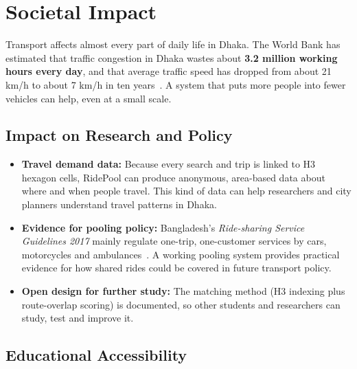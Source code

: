 \section{Societal Impact}
\label{sec:societal-impact}

Transport affects almost every part of daily life in Dhaka. The World Bank has
estimated that traffic congestion in Dhaka wastes about \textbf{3.2 million
working hours every day}, and that average traffic speed has dropped from about
21 km/h to about 7 km/h in ten years~\cite{wb_traffic}. A system that puts more
people into fewer vehicles can help, even at a small scale.

\subsection{Impact on Research and Policy}

\begin{itemize}
  \item \textbf{Travel demand data:} Because every search and trip is linked to
        H3 hexagon cells, RidePool can produce anonymous, area-based data about
        where and when people travel. This kind of data can help researchers
        and city planners understand travel patterns in Dhaka.
  \item \textbf{Evidence for pooling policy:} Bangladesh's \textit{Ride-sharing
        Service Guidelines 2017} mainly regulate one-trip, one-customer
        services by cars, motorcycles and ambulances~\cite{rideshare_guideline}.
        A working pooling system provides practical evidence for how shared
        rides could be covered in future transport policy.
  \item \textbf{Open design for further study:} The matching method (H3
        indexing plus route-overlap scoring) is documented, so other students
        and researchers can study, test and improve it.
\end{itemize}

\subsection{Educational Accessibility}

